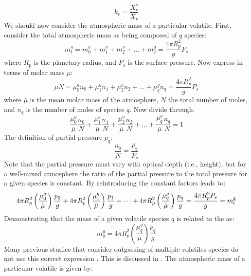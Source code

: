 \begin{equation}
k_v = \frac{X_v^s}{X_v}
\end{equation}
We should now consider the  atmospheric mass of a particular volatile.  First, consider the total atmospheric mass as being composed of $q$ species:
\begin{equation}
m_t^g = m_0^g + m_1^g + m_2^g + \dots + m_q^g = \frac{4 \pi R_p^2}{g} P_s
\end{equation}
where $R_p$ is the planetary radius, and $P_s$ is the surface pressure.  Now express in terms of molar mass $\mu$:
\begin{equation}
\bar{\mu} N = \mu_0^g n_0 + \mu_1^g n_1 + \mu_2^g n_2+ \dots + \mu_q^g n_q = \frac{4 \pi R_p^2}{g} P_s
\end{equation}
where $\bar{\mu}$ is the mean molar mass of the atmosphere, $N$ the total number of moles, and $n_q$ is the number of moles of species $q$.  Now divide through:
\begin{equation}
\frac{\mu_0^g}{\bar{\mu}} \frac{n_0}{N} + \frac{\mu_1^g}{\bar{\mu}} \frac{n_1}{N} + \frac{\mu_2^g}{\bar{\mu}} \frac{n_2}{N}+ \dots + \frac{\mu_q^g}{\bar{\mu}} \frac{n_q}{N} = 1
\end{equation}
The definition of partial pressure $p_q$:
\begin{equation}
\frac{n_q}{N} = \frac{p_q}{P_s}
\end{equation}
Note that the partial pressure must vary with optical depth (i.e., height), but for a well-mixed atmosphere the ratio of the partial pressure to the total pressure for a given species is constant.  By reintroducing the constant factors leads to:
\begin{equation}
4 \pi R_p^2 \left( \frac{\mu_0^g}{\bar{\mu}} \right) \frac{p_0}{g} + 4 \pi R_p^2 \left( \frac{\mu_1^g}{\bar{\mu}} \right) \frac{p_1}{g} + \dots + 4 \pi R_p^2 \left( \frac{\mu_q^g}{\bar{\mu}} \right) \frac{p_q}{g} = \frac{4 \pi R_p^2 P_s}{g} = m_{\rm t}^{\rm g}
\end{equation}
Demonstrating that the mass of a given volatile species $q$ is related to the  as:
\begin{equation}
m_q^g = 4 \pi R_p^2 \left( \frac{\mu_q^g}{\bar{\mu}} \right) \frac{p_q}{g}
\end{equation}
Many previous studies that consider outgassing of multiple volatiles species do not use this correct expression \citep[e.g.,][]{ET08,LMC13,SMD17,NKT19}.  This is discussed in \cite{BKW19}.  The  atmospheric mass of a particular volatile is given by:
